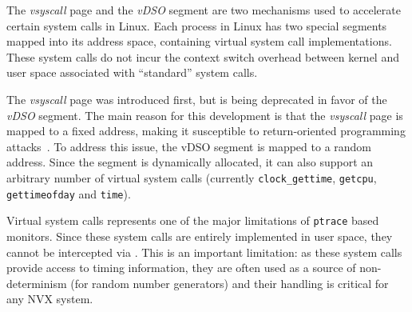 The \emph{vsyscall} page and the \emph{vDSO} segment are two
mechanisms used to accelerate certain system calls in Linux. Each
process in Linux has two special segments mapped into its address
space, containing virtual system call implementations. These system
calls do not incur the context switch overhead between kernel and
user space associated with ``standard'' system calls.

The \emph{vsyscall} page was introduced first, but is being deprecated
in favor of the \emph{vDSO} segment.
The main reason for this development is that the \emph{vsyscall} page
is mapped to a fixed address, making it susceptible to return-oriented
programming attacks~\cite{ROP:tissec12}. To address this issue, the
vDSO segment is mapped to a random address. Since the segment is
dynamically allocated, it can also support an arbitrary number of
virtual system calls (currently \lstinline`clock_gettime`, \lstinline`getcpu`,
\lstinline`gettimeofday` and \lstinline`time`).

Virtual system calls represents one of the major limitations of
\lstinline`ptrace` based monitors. Since these system calls are entirely
implemented in user space, they cannot be intercepted via \ptrace.
This is an important limitation: as these system calls provide access
to timing information, they are often used as a source of
non-determinism (\eg for random number generators) and their handling
is critical for any NVX system. %

